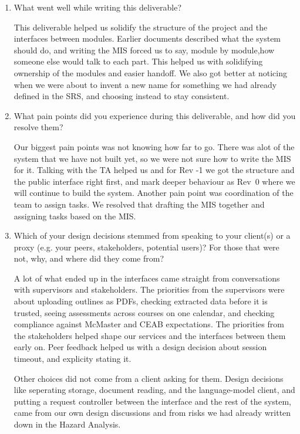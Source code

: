 \documentclass[12pt, titlepage]{article}
\begin{document}
\begin{enumerate}
  \item What went well while writing this deliverable?

This deliverable helped us solidify the structure of the project and the interfaces 
between modules. Earlier documents described what the system should do, and writing the
MIS forced us to say, module by module,how someone else would talk to
each part. This helped us with solidifying ownership of the modules and easier handoff.
We also got better at noticing when we were about to invent a new name for something we had already defined in the
SRS, and choosing instead to stay consistent. 

  \item What pain points did you experience during this deliverable, and how
    did you resolve them?

Our biggest pain points was not knowing how far to go. There was alot of the system 
that we have not built yet, so we were not sure how to write the MIS for it. Talking with the TA
helped us and for Rev -1 we got the structure and the public interface
right first, and mark deeper behaviour as Rev~0 where we will continue to build the system.
Another pain point was coordination of the team to assign tasks. We resolved that drafting 
the MIS together and assigning tasks based on the MIS.

  \item Which of your design decisions stemmed from speaking to your client(s)
  or a proxy (e.g. your peers, stakeholders, potential users)? For those that
  were not, why, and where did they come from?

A lot of what ended up in the interfaces came straight from conversations with
supervisors and stakeholders. The priorities from the supervisors were about uploading outlines as PDFs, checking
extracted data before it is trusted, seeing assessments across courses on one
calendar, and checking compliance against McMaster and CEAB expectations. The priorities from the stakeholders 
helped shape our services and the interfaces between them early on.
Peer feedback helped us with a design decision about session timeout, and explicity stating it.

Other choices did not come from a client asking for them. Design decisions like seperating storage,
document reading, and the language-model client, and putting a request controller
between the interface and the rest of the system, came from our own design
discussions and from risks we had already written down in the Hazard Analysis.


\end{enumerate}
\end{document}
